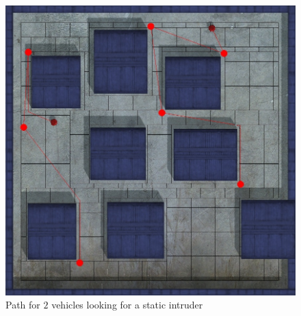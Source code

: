 \begin{figure}[h!t]
	\begin{center}
	\includegraphics[width=\linewidth,natwidth=824,natheight=823]{fig/dynamicPath.jpg}
	\end{center}
	\caption{Path for $2$ vehicles looking for a static intruder}
	\label{dynamicPath}
\end{figure}


